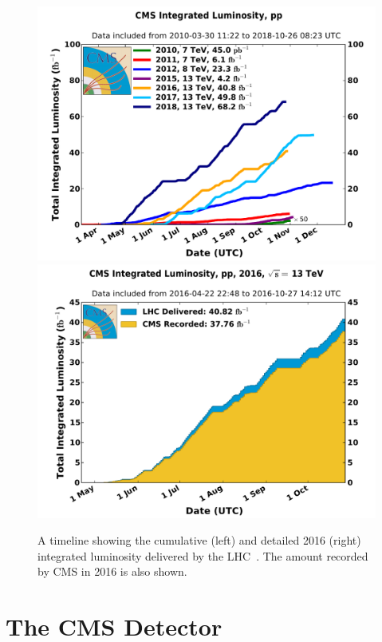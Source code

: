 \begin{figure}[!htbp]
	\centering
	\includegraphics[scale=0.40]{figures/int_lumi_cumulative_pp_2.pdf}
	\includegraphics[scale=0.40]{figures/int_lumi_per_day_cumulative_pp_2016.pdf}
	\caption{A timeline showing the cumulative (left) and detailed 2016 (right) integrated luminosity delivered by the LHC~\cite{CMS_lumi}. The amount recorded by CMS in 2016 is also shown.}
	\label{fig:lumi_cms}
\end{figure}


\section{The CMS Detector}

